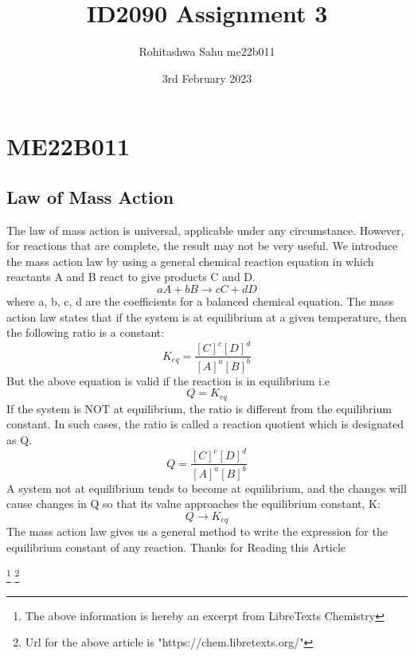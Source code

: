 \documentclass{article}
\title{ID2090 Assignment 3}
\author{Rohitashwa Sahu me22b011}
\date{ 3rd February 2023}
\begin{document}
\maketitle 

\section{ME22B011}
\subsection{Law of Mass Action}
The law of mass action is universal, applicable under any circumstance. However, for reactions that are complete, the result may not be very useful. We introduce the mass action law by using a general chemical reaction equation in which reactants A and B react to give products C and D.
\begin{equation}
    aA + bB \rightarrow cC + dD
\end{equation}
where a, b, c, d are the coefficients for a balanced chemical equation. The mass action law states that if the system is at equilibrium at a given temperature, then the following ratio is a constant:
\begin{equation}
    K_{eq} = \frac{[C]^c[D]^d}{[A]^a[B]^b}
\end{equation}
But the above equation is valid if the reaction is in equilibrium i.e 
\begin{equation}
    Q = K_{eq}
\end{equation}
If the system is NOT at equilibrium, the ratio is different from the equilibrium constant. In such cases, the ratio is called a reaction quotient which is designated as Q.
\begin{equation}
 Q = \frac{[C]^c[D]^d}{[A]^a[B]^b}   
\end{equation}
A system not at equilibrium tends to become at equilibrium, and the changes will cause changes in Q so that its value approaches the equilibrium constant, K:
\begin{equation}
    Q \rightarrow K_{eq}
\end{equation}
The mass action law gives us a general method to write the expression for the equilibrium constant of any reaction.
Thanks for Reading this Article




\footnote{The above information is hereby an excerpt from LibreTexts Chemistry}
\footnote{Url for the above article is "https://chem.libretexts.org/"}
\end{document}
